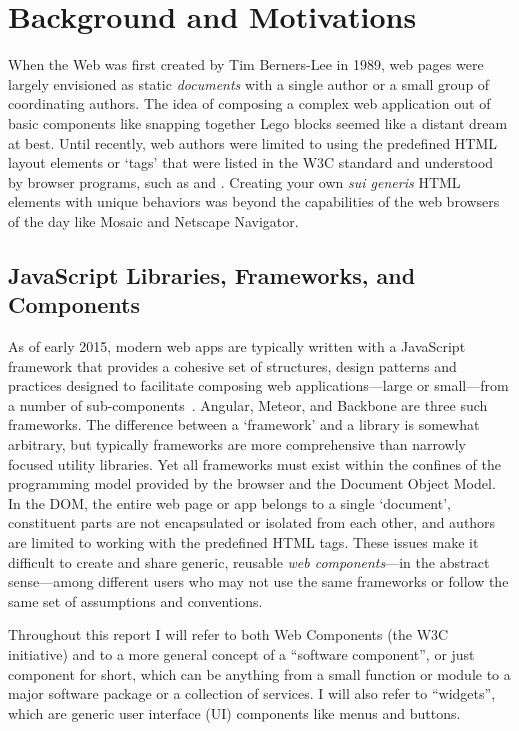 \chapter{Background and Motivations}
%
\label{ch:background}

When the Web was first created by Tim Berners-Lee in 1989, web pages were largely envisioned as static \textit{documents} with a single author or a small group of coordinating authors. 
The idea of composing a complex web application out of basic components like snapping together Lego blocks seemed like a distant dream at best.
Until recently, web authors were limited to using the predefined HTML layout elements or `tags' that were listed in the W3C standard and understood by browser programs, such as  and . 
Creating your own \textit{sui generis} HTML elements with unique behaviors was beyond the capabilities of the web browsers of the day like Mosaic
and Netscape Navigator.

\section{JavaScript Libraries, Frameworks, and Components}
As of early 2015, modern web apps are typically written with a JavaScript framework that provides a cohesive set of structures, design patterns and practices designed to facilitate composing web applications---large or small---from a number of sub-com\-ponents~\cite{dickey2014}.
Angular, Meteor, and Backbone are three such frameworks.
The difference between a `framework' and a library is somewhat arbitrary, but typically frameworks are more comprehensive than narrowly focused utility libraries.
Yet all frameworks must exist within the confines of the programming model provided by the browser and the Document Object Model. 
In the DOM, the entire web page or app belongs to a single `document', constituent parts are not encapsulated or isolated from each other, and authors are limited to working with the predefined HTML tags.
These issues make it difficult to create and share generic, reusable \textit{web components}---in the abstract sense---among different users who may not use the same frameworks or follow the same set of assumptions and conventions.

Throughout this report I will refer to both Web Components (the W3C initiative) and to a more general concept of a ``software component'', 
or just component for short, 
which can be anything from a small function or module to a major software package or a collection of services.
I will also refer to ``widgets'', which are generic user interface (UI) components like menus and buttons.

